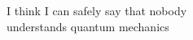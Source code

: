 \documentclass[preview]{standalone}
\begin{document}
\begin{center}
I think I can safely say that nobody \\ understands quantum mechanics
\end{center}
\end{document}

